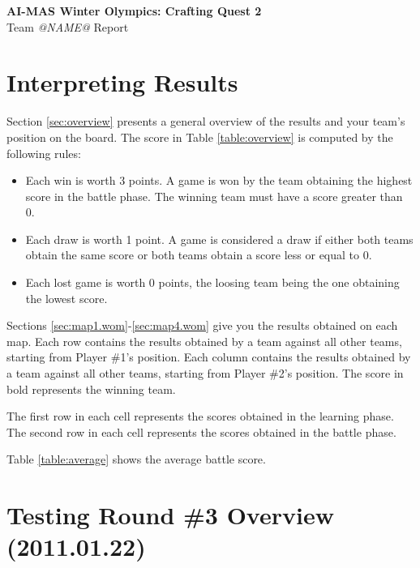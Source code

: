 \documentclass[a4paper,10pt]{article}
\begin{document}
\par {\huge \textbf{AI-MAS Winter Olympics: Crafting Quest 2}} \\
{\large Team \textit{@NAME@} Report} \\

\label{sec:results}
\section{Interpreting Results}

\par Section \ref{sec:overview} presents a general overview of the results and your team's position on the board. The score in Table \ref{table:overview} is computed by the following rules:
\begin{itemize}
	\item Each win is worth 3 points. A game is won by the team obtaining the highest score in the battle phase. The winning team must have a score greater than 0.
	\item Each draw is worth 1 point. A game is considered a draw if either both teams obtain the same score or both teams obtain a score less or equal to 0.
	\item Each lost game is worth 0 points, the loosing team being the one obtaining the lowest score.
\end{itemize}

\par Sections \ref{sec:map1.wom}-\ref{sec:map4.wom} give you the results obtained on each map. Each row contains the results obtained by a team against all other teams, starting from Player \#1's position. Each column contains the results obtained by a team against all other teams, starting from Player \#2's position. The score in bold represents the winning team.

\par The first row in each cell represents the scores obtained in the learning phase. The second row in each cell represents the scores obtained in the battle phase.

\par Table \ref{table:average} shows the average battle score.

\label{sec:overview}
\section{Testing Round \#3 Overview (2011.01.22)}
\end{document}
